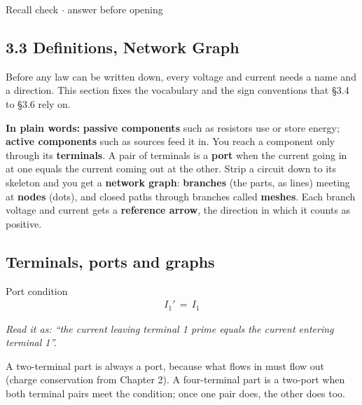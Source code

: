 \documentclass[11pt]{article}
\begin{document}
\begin{keepsection}
\begin{keepsection}
\begin{recallbox}{Recall check \ensuremath{\cdot} answer before opening}
\end{recallbox}
\end{keepsection}
\end{keepsection}

\begin{keepsection}
\section{3.3 Definitions, Network Graph}

Before any law can be written down, every voltage and current needs a name and a direction. This section fixes the vocabulary and the sign conventions that §3.4 to §3.6 rely on.

\begin{plainbox}\textbf{In plain words:} \textbf{passive components} such as resistors use or store energy; \textbf{active components} such as sources feed it in. You reach a component only through its \textbf{terminals}. A pair of terminals is a \textbf{port} when the current going in at one equals the current coming out at the other. Strip a circuit down to its skeleton and you get a \textbf{network graph}: \textbf{branches} (the parts, as lines) meeting at \textbf{nodes} (dots), and closed paths through branches called \textbf{meshes}. Each branch voltage and current gets a \textbf{reference arrow}, the direction in which it counts as positive.\end{plainbox}

\begin{keepsection}
\subsection{Terminals, ports and graphs}

\begin{equationcard}{Port condition}
\[ \begin{gathered} {I}_{1}'\, =\, {I}_{1} \end{gathered} \]
{\small \emph{Read it as: “the current leaving terminal 1 prime equals the current entering terminal 1”.}\par A two-terminal part is always a port, because what flows in must flow out (charge conservation from Chapter 2). A four-terminal part is a two-port when both terminal pairs meet the condition; once one pair does, the other does too.}
\end{equationcard}


\end{keepsection}
\end{keepsection}
\end{document}
